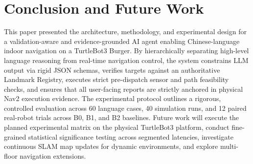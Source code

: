 \documentclass[conference]{IEEEtran}
\begin{document}
\section{Conclusion and Future Work}

This paper presented the architecture, methodology, and experimental design for a validation-aware and evidence-grounded AI agent enabling Chinese-language indoor navigation on a TurtleBot3 Burger. By hierarchically separating high-level language reasoning from real-time navigation control, the system constrains LLM output via rigid JSON schemas, verifies targets against an authoritative Landmark Registry, executes strict pre-dispatch sensor and path feasibility checks, and ensures that all user-facing reports are strictly anchored in physical Nav2 execution evidence. The experimental protocol outlines a rigorous, controlled evaluation across 60 language cases, 40 simulation runs, and 12 paired real-robot trials across B0, B1, and B2 baselines. Future work will execute the planned experimental matrix on the physical TurtleBot3 platform, conduct fine-grained statistical significance testing across segmented latencies, investigate continuous SLAM map updates for dynamic environments, and explore multi-floor navigation extensions.



\end{document}
